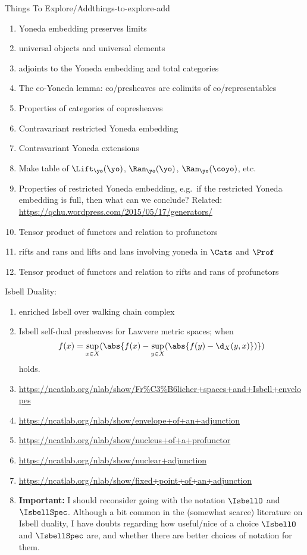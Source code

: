 \begin{remark}{Things To Explore/Add}{things-to-explore-add}
\begin{enumerate}
        \item Yoneda embedding preserves limits
        \item universal objects and universal elements
        \item adjoints to the Yoneda embedding and total categories
        \item The co-Yoneda lemma: co/presheaves are colimits of co/representables
        \item Properties of categories of copresheaves
        \item Contravariant restricted Yoneda embedding
        \item Contravariant Yoneda extensions
        \item Make table of $\Lift_{\yo}(\yo)$, $\Ran_{\yo}(\yo)$, $\Ran_{\yo}(\coyo)$, etc.
        \item Properties of restricted Yoneda embedding, e.g.\ if the restricted Yoneda embedding is full, then what can we conclude? Related: \url{https://qchu.wordpress.com/2015/05/17/generators/}
        \item Tensor product of functors and relation to profunctors
        \item rifts and rans and lifts and lans involving yoneda in $\Cats$ and $\Prof$
        \item Tensor product of functors and relation to rifts and rans of profunctors
    \end{enumerate}
    Isbell Duality:
    \begin{enumerate}
        \item enriched Isbell over walking chain complex
        \item Isbell self-dual presheaves for Lawvere metric spaces; when
            \[
                f(x)%
                =%
                \sup_{x\in X}(\abs{f(x)-\sup_{y\in X}(\abs{f(y)-\d_{X}(y,x)})})%
            \]%
            holds.
        \item \url{https://ncatlab.org/nlab/show/Fr\%C3\%B6licher+spaces+and+Isbell+envelopes}
        \item \url{https://ncatlab.org/nlab/show/envelope+of+an+adjunction}
        \item \url{https://ncatlab.org/nlab/show/nucleus+of+a+profunctor}
        \item \url{https://ncatlab.org/nlab/show/nuclear+adjunction}
        \item \url{https://ncatlab.org/nlab/show/fixed+point+of+an+adjunction}
        \item \textbf{Important: }I should reconsider going with the notation $\IsbellO$ and $\IsbellSpec$. Although a bit common in the (somewhat scarce) literature on Isbell duality, I have doubts regarding how useful/nice of a choice $\IsbellO$ and $\IsbellSpec$ are, and whether there are better choices of notation for them.

\end{enumerate}
\end{remark}
